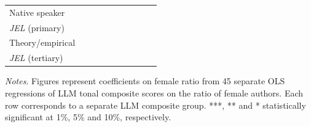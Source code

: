\begin{table}
\begin{threeparttable}
\begin{tabular}{p{3cm}S@{}S@{}S@{}S@{}S@{}S@{}S@{}S@{}S@{}}
            Native speaker                &               &               &               &               &           {}   &           {}   &           {}   &           {}   &           {}   \\
            \textit{JEL} (primary)        &               &               &               &               &               &               &           {}   &               &               \\
            Theory/empirical              &               &               &               &               &               &               &               &           {}   &               \\
            \textit{JEL} (tertiary)       &               &               &               &               &               &               &               &               &           {}   \\
            \bottomrule
        \end{tabular}
        \begin{tablenotes}
            \tiny
            \item \textit{Notes}. Figures represent coefficients on female ratio from 45 separate OLS regressions of LLM tonal composite scores on the ratio of female authors. Each row corresponds to a separate LLM composite group. ***, ** and * statistically significant at 1\%, 5\% and 10\%, respectively.
        \end{tablenotes}
    \end{threeparttable}

\end{table}
